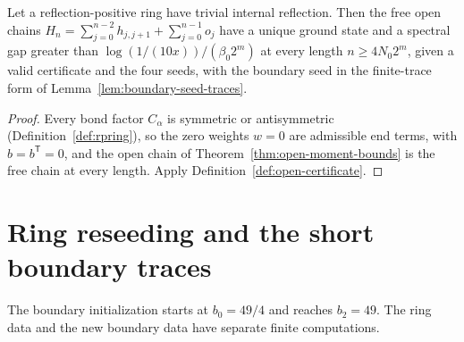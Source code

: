\begin{theorem}
  \label{thm:free-ends}
  \leanok
  Let a reflection-positive ring have trivial internal reflection. Then the free open chains
  \(H_n = \sum_{j=0}^{n-2} h_{j,j+1} + \sum_{j=0}^{n-1} o_j\) have a unique ground state and a
  spectral gap greater than \(\log(1/(10x))/(\beta_0 2^m)\) at every length \(n \ge 4N_0 2^m\),
  given a valid certificate and the four seeds, with the boundary seed in the finite-trace form of
  Lemma~\ref{lem:boundary-seed-traces}.
\end{theorem}
\begin{proof}
  \leanok
  Every bond factor \(C_\alpha\) is symmetric or antisymmetric (Definition~\ref{def:rpring}), so the
  zero weights \(w = 0\) are admissible end terms, with \(b = b^{\mathsf T} = 0\), and the open
  chain of Theorem~\ref{thm:open-moment-bounds} is the free chain at every length. Apply
  Definition~\ref{def:open-certificate}.
\end{proof}

\section{Ring reseeding and the short boundary traces}

The boundary initialization starts at \(b_0=49/4\) and reaches \(b_2=49\).
The ring data and the new boundary data have separate finite computations.

